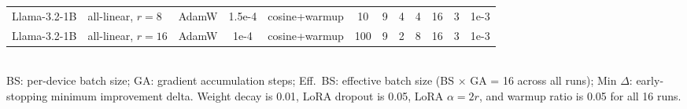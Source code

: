 \begin{table}[htbp]
{\begin{tabular}{llcccccccccc}
    Llama-3.2-1B & all-linear, $r{=}8$ & AdamW & 1.5e-4 & cosine+warmup & 10 & 9 & 4 & 4 & 16 & 3 & 1e-3 \\
    Llama-3.2-1B & all-linear, $r{=}16$ & AdamW & 1e-4 & cosine+warmup & 100 & 9 & 2 & 8 & 16 & 3 & 1e-3 \\
    \bottomrule
  \end{tabular}}\\[2pt]
  {\footnotesize BS: per-device batch size; GA: gradient accumulation steps; Eff.\ BS: effective batch size (BS $\times$ GA = 16 across all runs); Min $\Delta$: early-stopping minimum improvement delta. Weight decay is 0.01, LoRA dropout is 0.05, LoRA $\alpha = 2r$, and warmup ratio is 0.05 for all 16 runs.}
\end{table}
